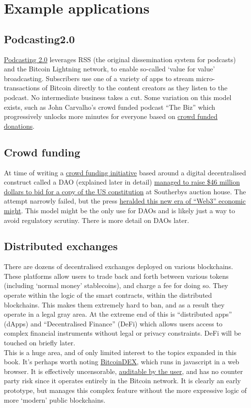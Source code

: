\section{Example applications}
\subsection{Podcasting2.0}
\href{https://medium.com/@everywheretrip/an-introduction-to-podcasting-2-0-3c4f61ea17f4}{Podcasting 2.0} leverages RSS (the original dissemination system for podcasts) and the Bitcoin Lightning network, to enable so-called `value for value' broadcasting. Subscribers use one of a variety of apps to stream micro-transactions of Bitcoin directly to the content creators as they listen to the podcast. No intermediate business takes a cut. Some variation on this model exists, such as John Carvalho's crowd funded podcast ``The Biz'' which progressively unlocks more minutes for everyone based on \href{https://thebiz.pro/about#crowdwall}{crowd funded donations}.
\subsection{Crowd funding}
At time of writing a \href{https://www.constitutiondao.com/}{crowd funding initiative} based around a digital decentralised construct called a DAO (explained later in detail) \href{https://www.coindesk.com/business/2021/12/06/daos-and-the-next-crowdfunding-gold-rush/}{managed to raise \$46 million dollars to bid for a copy of the US constitution} at Southerbys auction house. The attempt narrowly failed, but the press \href{https://www.coindesk.com/business/2021/12/09/what-kickstarter-going-decentralized-means-for-web-3/}{heralded this new era of ``Web3'' economic might}. This model might be the only use for DAOs and is likely just a way to avoid regulatory scrutiny. There is more detail on DAOs later.
\subsection{Distributed exchanges}
There are dozens of decentralised exchanges deployed on various blockchains. These platforms allow users to trade back and forth between various tokens (including `normal money' stablecoins), and charge a fee for doing so. They operate within the logic of the smart contracts, within the distributed blockchains. This makes them extremely hard to ban, and as a result they operate in a legal gray area. At the extreme end of this is ``distributed apps'' (dApps) and ``Decentralised Finance'' (DeFi) which allows users access to complex financial instruments without legal or privacy constraints. DeFi will be touched on briefly later.\\
This is a huge area, and of only limited interest to the topics expanded in this book. It's perhaps worth noting \href{https://bitcoin-dex.net/about/index.html}{BitcoinDEX}, which runs in javascript in a web browser. It is effectively uncensorable, \href{https://bitcoin-dex.net/tokens.js}{auditable by the user}, and has no counter party risk since it operates entirely in the Bitcoin network. It is clearly an early prototype, but manages this complex feature without the more expressive logic of more `modern' public blockchains.
